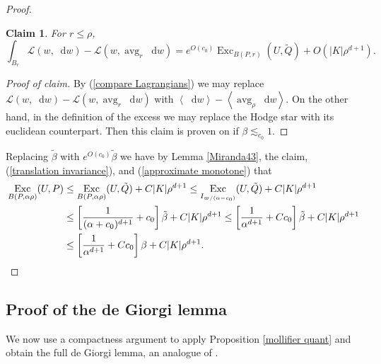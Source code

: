 \documentclass[reqno,10pt]{amsart}
\DeclareMathOperator{\avg}{avg}
\DeclareMathOperator{\Exc}{Exc}
\newcommand*\dif{\mathop{}\!\mathrm{d}}
\newcommand{\Lagrange}{\mathscr L}
\def\Japan#1{\left \langle #1 \right \rangle}
\newtheorem{claim}{Claim}[theorem]
\theoremstyle{definition}
\numberwithin{equation}{section}
\begin{document}
\begin{proof}
\begin{claim}
For $r \leq \rho$,
$$\int_{B_r} \Lagrange(w, \dif w) - \Lagrange(w, \avg_r \dif w) = e^{O(c_0)} \Exc_{B(P, r)} (U, \tilde Q) + O(|K| \rho^{d + 1}).$$
\end{claim}
\begin{proof}[Proof of claim]
By (\ref{compare Lagrangians}) we may replace $\Lagrange(w, \dif w) - \Lagrange(w, \avg_r \dif w)$ with $\Japan{\dif w} - \Japan{\avg_\rho \dif w}$.
On the other hand, in the definition of the excess we may replace the Hodge star with its euclidean counterpart.
Then this claim is proven on \cite[pg83]{Giusti77} if $\beta \lesssim_{c_0} 1$.
\end{proof}

Replacing $\tilde \beta$ with $e^{O(c_0)} \tilde \beta$ we have by Lemma \ref{Miranda43}, the claim, (\ref{translation invariance}), and (\ref{approximate monotone}) that 
\begin{align*}
\Exc_{B(P, \alpha \rho)} (U, P) &\leq \Exc_{B(P, \alpha \rho)} (U, \tilde Q) + C|K| \rho^{d + 1} \leq \Exc_{I_{\varpi/(\alpha - c_0)}} (U, \tilde Q) + C|K| \rho^{d + 1}\\
&\leq \left[\frac{1}{(\alpha + c_0)^{d + 1}} + c_0\right] \tilde \beta + C|K| \rho^{d + 1} \leq \left[\frac{1}{\alpha^{d + 1}} + Cc_0\right] \tilde \beta + C|K| \rho^{d + 1} \\
&\leq \left[\frac{1}{\alpha^{d + 1}} + Cc_0\right] \beta + C|K| \rho^{d + 1}. 
\qedhere 
\end{align*}
\end{proof}

\subsection{Proof of the de Giorgi lemma}
We now use a compactness argument to apply Proposition \ref{mollifier quant} and obtain the full de Giorgi lemma, an analogue of \cite[Teorema 5.7]{Miranda66}.
\end{document}
